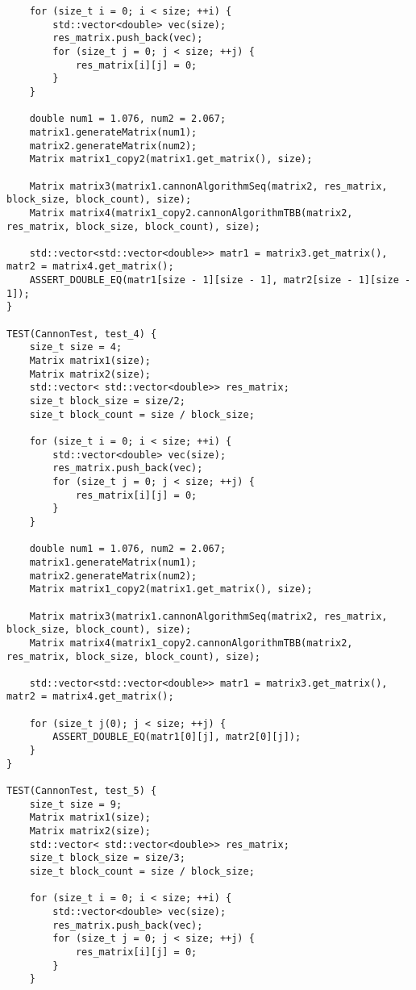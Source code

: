 \documentclass{report}
\begin{document}
\begin{lstlisting}
    for (size_t i = 0; i < size; ++i) {
        std::vector<double> vec(size);
        res_matrix.push_back(vec);
        for (size_t j = 0; j < size; ++j) {
            res_matrix[i][j] = 0;
        }
    }

    double num1 = 1.076, num2 = 2.067;
    matrix1.generateMatrix(num1);
    matrix2.generateMatrix(num2);
    Matrix matrix1_copy2(matrix1.get_matrix(), size);

    Matrix matrix3(matrix1.cannonAlgorithmSeq(matrix2, res_matrix, block_size, block_count), size);
    Matrix matrix4(matrix1_copy2.cannonAlgorithmTBB(matrix2, res_matrix, block_size, block_count), size);

    std::vector<std::vector<double>> matr1 = matrix3.get_matrix(), matr2 = matrix4.get_matrix();
    ASSERT_DOUBLE_EQ(matr1[size - 1][size - 1], matr2[size - 1][size - 1]);
}

TEST(CannonTest, test_4) {
    size_t size = 4;
    Matrix matrix1(size);
    Matrix matrix2(size);
    std::vector< std::vector<double>> res_matrix;
    size_t block_size = size/2;
    size_t block_count = size / block_size;

    for (size_t i = 0; i < size; ++i) {
        std::vector<double> vec(size);
        res_matrix.push_back(vec);
        for (size_t j = 0; j < size; ++j) {
            res_matrix[i][j] = 0;
        }
    }

    double num1 = 1.076, num2 = 2.067;
    matrix1.generateMatrix(num1);
    matrix2.generateMatrix(num2);
    Matrix matrix1_copy2(matrix1.get_matrix(), size);

    Matrix matrix3(matrix1.cannonAlgorithmSeq(matrix2, res_matrix, block_size, block_count), size);
    Matrix matrix4(matrix1_copy2.cannonAlgorithmTBB(matrix2, res_matrix, block_size, block_count), size);

    std::vector<std::vector<double>> matr1 = matrix3.get_matrix(), matr2 = matrix4.get_matrix();

    for (size_t j(0); j < size; ++j) {
        ASSERT_DOUBLE_EQ(matr1[0][j], matr2[0][j]);
    }
}

TEST(CannonTest, test_5) {
    size_t size = 9;
    Matrix matrix1(size);
    Matrix matrix2(size);
    std::vector< std::vector<double>> res_matrix;
    size_t block_size = size/3;
    size_t block_count = size / block_size;

    for (size_t i = 0; i < size; ++i) {
        std::vector<double> vec(size);
        res_matrix.push_back(vec);
        for (size_t j = 0; j < size; ++j) {
            res_matrix[i][j] = 0;
        }
    }


\end{lstlisting}
\end{document}
